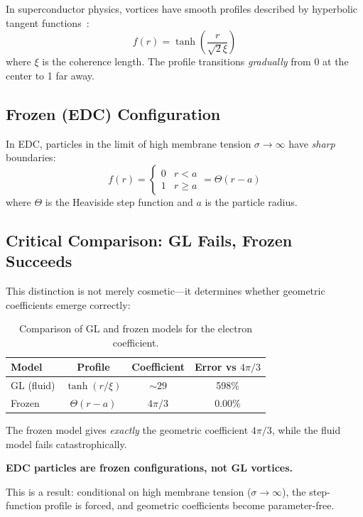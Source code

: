 In superconductor physics, vortices have smooth profiles described by hyperbolic tangent
functions~\cite{Tinkham2004,deGennes1999}:
\begin{equation}
f(r) = \tanh\left(\frac{r}{\sqrt{2}\xi}\right)
\label{eq:ch2_gl_profile}
\end{equation}
where $\xi$ is the coherence length. The profile transitions \emph{gradually} from 0 at the
center to 1 far away.

\subsection{Frozen (EDC) Configuration}

In EDC, particles in the limit of high membrane tension $\sigma \to \infty$ have \emph{sharp} boundaries:
\begin{equation}
f(r) = \begin{cases}
0 & r < a \\
1 & r \geq a
\end{cases}
= \Theta(r - a)
\label{eq:ch2_frozen_profile}
\end{equation}
where $\Theta$ is the Heaviside step function and $a$ is the particle radius.

\subsection{Critical Comparison: GL Fails, Frozen Succeeds}

This distinction is not merely cosmetic---it determines whether geometric coefficients
emerge correctly:

\begin{table}[H]
\centering
\begin{tabular}{lccc}
\toprule
\textbf{Model} & \textbf{Profile} & \textbf{Coefficient} & \textbf{Error vs $4\pi/3$} \\
\midrule
GL (fluid) & $\tanh(r/\xi)$ & $\sim 29$ & 598\% \\
Frozen & $\Theta(r-a)$ & $4\pi/3$ & 0.00\% \\
\bottomrule
\end{tabular}
\caption{Comparison of GL and frozen models for the electron coefficient.}
\label{tab:ch2_gl_vs_frozen}
\end{table}

The frozen model gives \emph{exactly} the geometric coefficient $4\pi/3$, while the fluid
model fails catastrophically.

\begin{tcolorbox}[colback=green!5!white, colframe=green!50!black,
    title=\textbf{Key Result}]
\textbf{EDC particles are frozen configurations, not GL vortices.}

This is a \tagDc{} result: conditional on high membrane tension ($\sigma \to \infty$),
the step-function profile is forced, and geometric coefficients become parameter-free.
\end{tcolorbox}

